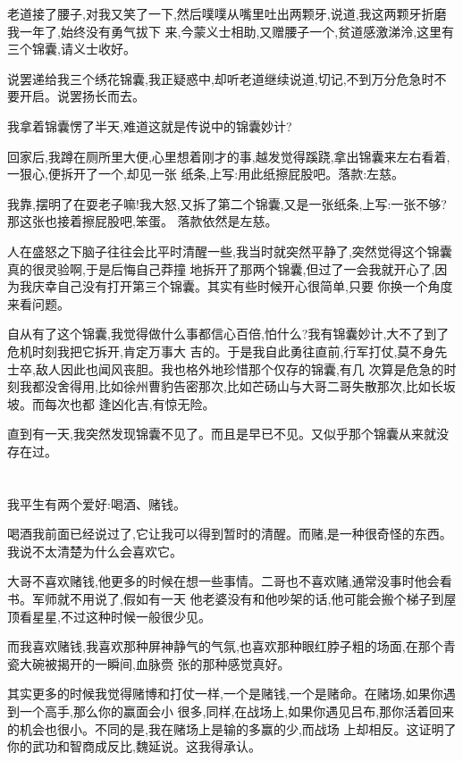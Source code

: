 ﻿\documentclass[12pt,twocolumn]{article}
\begin{document}
老道接了腰子,对我又笑了一下,然后噗噗从嘴里吐出两颗牙,说道,我这两颗牙折磨我一年了,始终没有勇气拔下
来,今蒙义士相助,又赠腰子一个,贫道感激涕泠,这里有三个锦囊,请义士收好。

说罢递给我三个绣花锦囊,我正疑惑中,却听老道继续说道,切记,不到万分危急时不要开启。说罢扬长而去。

我拿着锦囊愣了半天,难道这就是传说中的锦囊妙计?

回家后,我蹲在厕所里大便,心里想着刚才的事,越发觉得蹊跷,拿出锦囊来左右看着,一狠心,便拆开了一个,却见一张
纸条,上写:用此纸擦屁股吧。落款:左慈。

我靠,摆明了在耍老子嘛!我大怒,又拆了第二个锦囊,又是一张纸条,上写:一张不够?那这张也接着擦屁股吧,笨蛋。
落款依然是左慈。

人在盛怒之下脑子往往会比平时清醒一些,我当时就突然平静了,突然觉得这个锦囊真的很灵验啊,于是后悔自己莽撞
地拆开了那两个锦囊,但过了一会我就开心了,因为我庆幸自己没有打开第三个锦囊。其实有些时候开心很简单,只要
你换一个角度来看问题。

自从有了这个锦囊,我觉得做什么事都信心百倍,怕什么?我有锦囊妙计,大不了到了危机时刻我把它拆开,肯定万事大
吉的。于是我自此勇往直前,行军打仗,莫不身先士卒,敌人因此也闻风丧胆。我也格外地珍惜那个仅存的锦囊,有几
次算是危急的时刻我都没舍得用,比如徐州曹豹告密那次,比如芒砀山与大哥二哥失散那次,比如长坂坡。而每次也都
逢凶化吉,有惊无险。

直到有一天,我突然发现锦囊不见了。而且是早已不见。又似乎那个锦囊从来就没存在过。

\section{}

我平生有两个爱好:喝酒、赌钱。

喝酒我前面已经说过了,它让我可以得到暂时的清醒。而赌,是一种很奇怪的东西。我说不太清楚为什么会喜欢它。

大哥不喜欢赌钱,他更多的时候在想一些事情。二哥也不喜欢赌,通常没事时他会看书。军师就不用说了,假如有一天
他老婆没有和他吵架的话,他可能会搬个梯子到屋顶看星星,不过这种时候一般很少见。

而我喜欢赌钱,我喜欢那种屏神静气的气氛,也喜欢那种眼红脖子粗的场面,在那个青瓷大碗被揭开的一瞬间,血脉赍
张的那种感觉真好。

其实更多的时候我觉得赌博和打仗一样,一个是赌钱,一个是赌命。在赌场,如果你遇到一个高手,那么你的赢面会小
很多,同样,在战场上,如果你遇见吕布,那你活着回来的机会也很小。不同的是,我在赌场上是输的多赢的少,而战场
上却相反。这证明了你的武功和智商成反比,魏延说。这我得承认。
\end{document}
